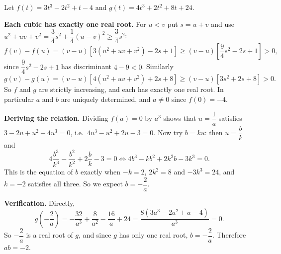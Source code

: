 Let $f(t)=3t^3-2t^2+t-4$ and $g(t)=4t^3+2t^2+8t+24$.

\textbf{Each cubic has exactly one real root.} For $u<v$ put $s=u+v$ and use $u^2+uv+v^2=\dfrac{3}{4}s^2+\dfrac{1}{4}(u-v)^2\ge\dfrac{3}{4}s^2$:
\[
f(v)-f(u)=(v-u)\left[3\left(u^2+uv+v^2\right)-2s+1\right]\ge(v-u)\left[\dfrac{9}{4}s^2-2s+1\right]>0,
\]
since $\dfrac{9}{4}s^2-2s+1$ has discriminant $4-9<0$. Similarly
\[
g(v)-g(u)=(v-u)\left[4\left(u^2+uv+v^2\right)+2s+8\right]\ge(v-u)\left[3s^2+2s+8\right]>0 .
\]
So $f$ and $g$ are strictly increasing, and each has exactly one real root. In particular $a$ and $b$ are uniquely determined, and $a\ne0$ since $f(0)=-4$.

\textbf{Deriving the relation.} Dividing $f(a)=0$ by $a^3$ shows that $u=\dfrac{1}{a}$ satisfies $3-2u+u^2-4u^3=0$, i.e.\ $4u^3-u^2+2u-3=0$. Now try $b=ku$: then $u=\dfrac {b}{k}$ and
\[
4\dfrac{b^3}{k^3}-\dfrac{b^2}{k^2}+2\dfrac {b} {k}-3=0\iff 4b^3-kb^2+2k^2b-3k^3=0 .
\]
This is the equation of $b$ exactly when $-k=2$, $2k^2=8$ and $-3k^3=24$, and $k=-2$ satisfies all three. So we expect $b=-\dfrac{2}{a}$.

\textbf{Verification.} Directly,
\[
g\left(-\dfrac{2}{a}\right)=-\dfrac{32}{a^3}+\dfrac{8}{a^2}-\dfrac{16}{a}+24=\dfrac{8\left(3a^3-2a^2+a-4\right)}{a^3}=0 .
\]
So $-\dfrac{2}{a}$ is a real root of $g$, and since $g$ has only one real root, $b=-\dfrac{2}{a}$. Therefore $ab=\boxed{-2}$.
